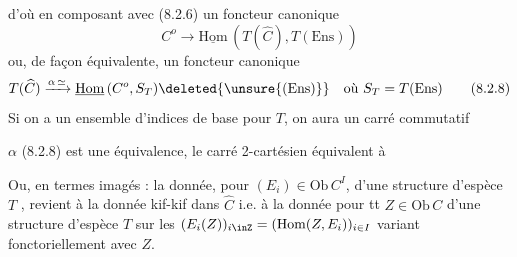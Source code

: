 d'où  en composant avec (8.2.6) un foncteur canonique
\[
 C^o\longrightarrow\underline{\mathrm{Hom}}\,(T(\widehat C),T(\mathrm{Ens}))\tag*{(8.2.7)}
\]
ou, de façon équivalente, un foncteur canonique
\[
 T(\widehat C)\xrightarrow{\alpha\,\simeq}\underline{\mathrm{Hom}}\,(C^o,S_T)\deleted{\unsure{(\mathrm{Ens})}}\quad\text{où }S_T=T(\mathrm{Ens})\tag*{(8.2.8)}
\]
Si on a un ensemble d'indices de base pour $T$, on aura un
carré commutatif

 $\alpha$ (8.2.8) est  une équivalence,  le carré 2-cartésien
 équivalent à

\margin{$\underset{\rightarrow}{\lambda}=\varnothing$}
Ou, en termes imagés : la donnée, pour $(E_i)\in\mathrm{Ob}\,C^I$, d'une
structure d'espèce $T$ , revient à la donnée 
kif-kif dans $\widehat C$ i.e. à la donnée pour tt $Z\in\mathrm{Ob}\,C$ d'une
structure d'espèce $T$ sur les 
$(E_i(Z))_{i\inZ}=(\mathrm{Hom}(Z,E_i))_{i\in I}$
variant fonctoriellement avec $Z$.

